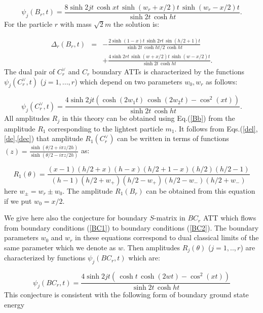 \documentclass[a4paper,12pt,titlepage,final]{article}
\begin{document}
\begin{equation}
\psi _{j}(B_{r},t)=\frac{8\sinh 2jt\,\cosh xt\,\sinh (w_{r}+x/2)t\,\sinh
(w_{r}-x/2)t}{\sinh 2t\,\cosh ht}.  \label{deb}
\end{equation}
For the particle $r$ with mass $\sqrt{2}m$ the solution is:

\begin{eqnarray}
\Delta _{r}(B_{r},t) &=&-\frac{2\sinh (1-x)t\,\sinh 2rt\,\sin (h/2+1)t}
{\sinh2t\,\cosh ht/2\,\cosh ht}  \label{dnb} \\
&&+\frac{4\sinh 2rt\,\sinh (w+x/2)t\,\sinh (w-x/2)t}{\sinh 2t\,\cosh ht}.
\nonumber
\end{eqnarray}
The dual pair of $C_{r}^{\vee }$ and $C_{r}$ boundary ATTs is characterized
by the functions $\psi _{j}(C_{r}^{\vee },t)$ ($j=1,...,r$) which depend on
two parameters $w_{0},w_{r}$ as follows:

\begin{equation}
\psi _{j}(C_{r}^{\vee },t)=\frac{4\sinh 2jt(\cosh (2w_{1}t)\,\cosh
(2w_{2}t)-\cos ^{2}(xt))}{\sinh 2t\,\cosh ht}.  \label{dec}
\end{equation}
All amplitudes $R_{j}$ in this theory can be obtained using Eq.(\ref{Bb})
from the amplitude $R_{1}$ corresponding to the lightest particle $m_{1}$.
It follows from Eqs.(\ref{del},\ref{de},\ref{dec}) that amplitude
$R_{1}(C_{r}^{\vee })$ can be written in terms of functions $(z)=
\frac{\sinh(\theta /2+i\pi z/2h)}{\sinh (\theta /2-i\pi z/2h)}$ as:

\begin{equation}
R_{1}(\theta )=\frac{(x-1)(h/2+x)(h-x)(h/2+1-x)(h/2)(h/2-1)}
{(h-1)(h/2+w_{+})(h/2-w_{+})(h/2-w_{-})(h/2+w_{-})}  \label{r1c}
\end{equation}
here $w_{\pm }=w_{r}\pm w_{0}$. The amplitude $R_{1}(B_{r})$ can be obtained
from this equation if we put $w_{0}=x/2$.

We give here also the conjecture for boundary $S$-matrix in $BC_{r}$ ATT
which flows from boundary conditions (\ref{BC1}) to boundary conditions
(\ref{BC2}). The boundary parameters $w_{0}$ and $w_{r}$ in these equations
correspond to dual classical limits of the same parameter which we
denote as
$w$. Then amplitudes $R_{j}(\theta )$ ($j=1,..,r$) are characterized by
functions $\psi _{j}(BC_{r},t)$ which are:

\begin{equation}
\psi _{j}(BC_{r},t)=\frac{4\sinh 2jt(\,\cosh t\,\cosh (2wt)-\cos ^{2}(xt))}
{\sinh 2t\,\cosh ht}  \label{debc}
\end{equation}
This conjecture is consistent with the following form of boundary ground
state energy
\end{document}

